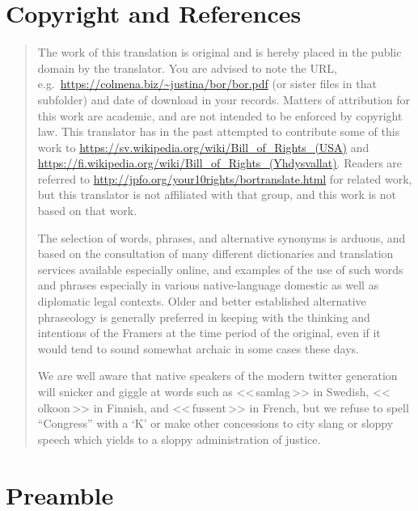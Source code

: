\documentclass[a4paper,landscape,12pt]{article}
\begin{document}
\section*{Copyright and References}

\begin{quote}
The work of this translation is original and is hereby placed in the public domain by the translator. You are advised to note the URL, e.g.~\url{https://colmena.biz/~justina/bor/bor.pdf} (or sister files in that subfolder) and date of download in your records. Matters of attribution for this work are academic, and are not intended to be enforced by copyright law. This translator has in the past attempted to contribute some of this work to \foreignlanguage{swedish}{\url{https://sv.wikipedia.org/wiki/Bill_of_Rights_(USA)}} and \foreignlanguage{finnish}{\url{https://fi.wikipedia.org/wiki/Bill_of_Rights_(Yhdysvallat)}}. Readers are referred to \url{http://jpfo.org/your10rights/bortranslate.html} for related work, but this translator is not affiliated with that group, and this work is not based on that work.

	The selection of words, phrases, and alternative synonyms is arduous, and based on the consultation of many different dictionaries and translation services available especially online, and examples of the use of such words and phrases especially in various native-language domestic as well as diplomatic legal contexts. Older and better established alternative phraseology is generally preferred in keeping with the thinking and intentions of the Framers at the time period of the original, even if it would tend to sound somewhat archaic in some cases these days.

	We are well aware that native speakers of the modern twitter generation will snicker and giggle at words such as \foreignlanguage{swedish}{<<\,samlag\,>>} in Swedish, \foreignlanguage{finnish}{<<\,olkoon\,>>} in Finnish, and \foreignlanguage{french}{<<\,fussent\,>>} in French, but we refuse to spell ``Congress'' with a `K' or make other concessions to city slang or sloppy speech which yields to a sloppy administration of justice.
\end{quote}

\section*{Preamble}
\end{document}
